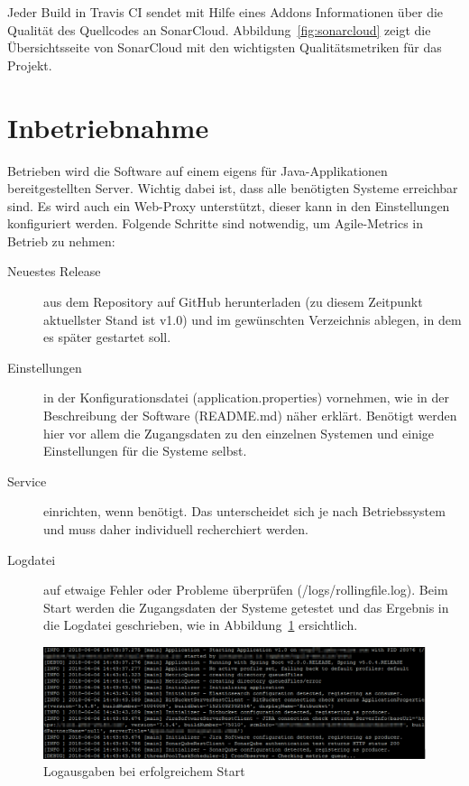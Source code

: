 Jeder Build in Travis CI sendet mit Hilfe eines Addons Informationen über die Qualität des Quellcodes an SonarCloud.
Abbildung~\ref{fig:sonarcloud} zeigt die Übersichtsseite von SonarCloud mit den wichtigsten Qualitätsmetriken für das Projekt.

\clearpage
\section{Inbetriebnahme}

Betrieben wird die Software auf einem eigens für Java-Applikationen bereitgestellten Server. 
Wichtig dabei ist, dass alle benötigten Systeme erreichbar sind. 
Es wird auch ein Web-Proxy unterstützt, dieser kann in den Einstellungen konfiguriert werden.
Folgende Schritte sind notwendig, um Agile-Metrics in Betrieb zu nehmen:
\begin{description}
    \item[Neuestes Release] aus dem Repository auf GitHub herunterladen (zu diesem Zeitpunkt aktuellster Stand ist v1.0) und im gewünschten Verzeichnis ablegen, in dem es später gestartet soll.
    \item[Einstellungen] in der Konfigurationsdatei (application.properties) vornehmen, wie in der Beschreibung der Software (README.md) näher erklärt. Benötigt werden hier vor allem die Zugangsdaten zu den einzelnen Systemen und einige Einstellungen für die Systeme selbst.
    \item[Service] einrichten, wenn benötigt. Das unterscheidet sich je nach Betriebssystem und muss daher individuell recherchiert werden.
    \item[Logdatei] auf etwaige Fehler oder Probleme überprüfen (/logs/rollingfile.log). Beim Start werden die Zugangsdaten der Systeme getestet und das Ergebnis in die Logdatei geschrieben, wie in Abbildung~\ref{fig:successful-start} ersichtlich.
\end{description}

\begin{savenotes}
    \begin{figure}[H] 
        \centering
            \includegraphics[width=1.0\textwidth]{img/successful-start.png}
        \caption{Logausgaben bei erfolgreichem Start}\label{fig:successful-start}
    \end{figure}
\end{savenotes}

